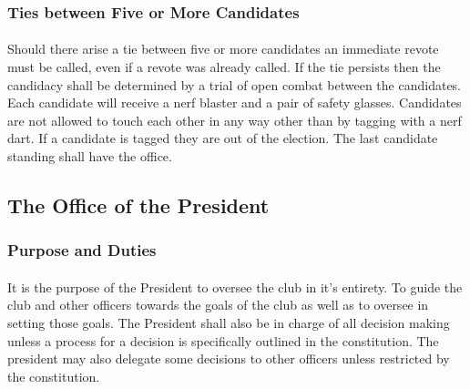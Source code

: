 \documentclass[12pt]{article}
\begin{document}
\subsubsection{Ties between Five or More Candidates}
\paragraph{}
Should there arise a tie between five or more candidates an immediate revote must be called, even if a revote was already called. 
If the tie persists then the candidacy shall be determined by a trial of open combat between the candidates. 
Each candidate will receive a nerf blaster and a pair of safety glasses. 
Candidates are not allowed to touch each other in any way other than by tagging with a nerf dart.
If a candidate is tagged they are out of the election. The last candidate standing shall have the office.


\subsection{The Office of the President}
\subsubsection{Purpose and Duties}
\paragraph{}
It is the purpose of the President to oversee the club in it's entirety. To guide the club and other officers towards the goals of the club as well as to oversee in setting those goals. The President shall
also be in charge of all decision making unless a process for a decision is specifically outlined in the constitution. The president may also delegate some decisions to other officers unless
restricted by the constitution.
\end{document}
